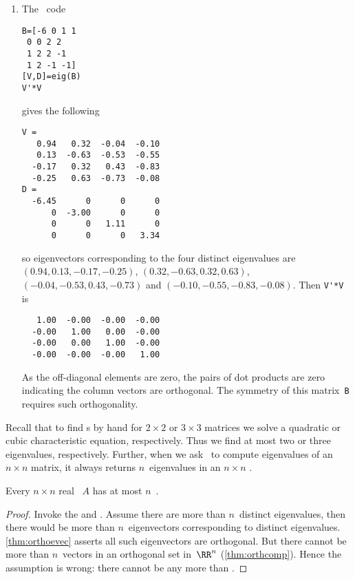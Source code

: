 \begin{example}
\begin{solution}
\begin{enumerate}
\item The \script\ code 
\setbox\ajrqrbox\hbox{}%
\marginpar{\usebox{\ajrqrbox}}%
\begin{verbatim}
B=[-6 0 1 1
 0 0 2 2
 1 2 2 -1
 1 2 -1 -1]
[V,D]=eig(B)
V'*V
\end{verbatim}
gives the following \twodp
\begin{verbatim}
V =
   0.94   0.32  -0.04  -0.10
   0.13  -0.63  -0.53  -0.55
  -0.17   0.32   0.43  -0.83
  -0.25   0.63  -0.73  -0.08
D =
  -6.45      0      0      0
      0  -3.00      0      0
      0      0   1.11      0
      0      0      0   3.34
\end{verbatim}
so eigenvectors corresponding to the four distinct eigenvalues are
\((0.94,0.13,-0.17,-0.25)\), \((0.32,-0.63,0.32,0.63)\), \((-0.04,-0.53,0.43,-0.73)\) and \((-0.10,-0.55,-0.83,-0.08)\).
Then \verb|V'*V| is \twodp
\begin{verbatim}
   1.00  -0.00  -0.00  -0.00
  -0.00   1.00   0.00  -0.00
  -0.00   0.00   1.00  -0.00
  -0.00  -0.00  -0.00   1.00
\end{verbatim}
As the off-diagonal elements are zero, the pairs of dot products are zero indicating the column vectors are orthogonal.  
The symmetry of this matrix~\verb|B| requires such orthogonality.
\end{enumerate}
\end{solution}
\end{example}





Recall that to find s by hand for \(2\times2\) or \(3\times 3\) matrices we solve a quadratic or cubic characteristic equation, respectively.
Thus we find at most two or three eigenvalues, respectively.
Further, when we ask \script\ to compute eigenvalues of an \(n\times n\) matrix, it always returns \(n\)~eigenvalues in an \(n\times n\) .


\begin{theorem} \label{thm:lenlam}
Every \(n\times n\) real ~\(A\) has at most \(n\)~.
\end{theorem}
\begin{proof} 
Invoke the  and . 
Assume there are more than \(n\)~distinct eigenvalues, then there would be more than \(n\)~eigenvectors corresponding to distinct eigenvalues.
\autoref{thm:orthoevec} asserts all such eigenvectors are orthogonal. 
But there cannot be more than \(n\)~vectors in an orthogonal set in~\(\RR^n\) (\autoref{thm:orthcomp}).
Hence the assumption is wrong: there cannot be any more than .
\end{proof}


